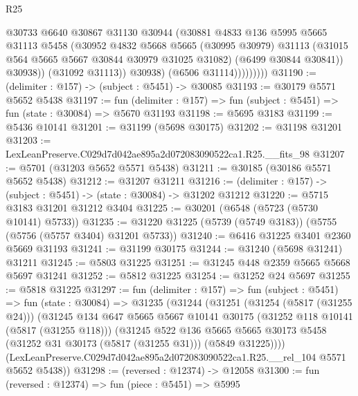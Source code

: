 \begin{lexlean}{R25}
\begin{coremodule}
                          @30733
                          @6640
                          @30867
                          @31130
                          @30944
                          (@30881
                            @4833
                            @136
                            @5995
                            @5665
                            @31113
                            @5458
                            (@30952
                              @4832
                              @5668
                              @5665
                              (@30995 @30979)
                              @31113
                              (@31015 @564 @5665 @5667 @30844 @30979 @31025 @31082)
                              (@6499 @30844 @30841))
                            @30938))
                        (@31092 @31113))
                      @30938)
                    (@6506 @31114)))))))))
@31190 := (delimiter : @157) -> (subject : @5451) -> @30085
@31193 := @30179 @5571 @5652 @5438
@31197 := fun (delimiter : @157) => fun (subject : @5451) => fun (state : @30084) => @5670 @31193
@31198 := @5695 @3183
@31199 := @5436 @10141
@31201 := @31199 (@5698 @30175)
@31202 := @31198 @31201
@31203 := LexLeanPreserve.C029d7d042ae895a2d072083090522ca1.R25.__fits_98
@31207 := @5701 (@31203 @5652 @5571 @5438)
@31211 := @30185 (@30186 @5571 @5652 @5438)
@31212 := @31207 @31211
@31216 := (delimiter : @157) -> (subject : @5451) -> (state : @30084) -> @31202 @31212
@31220 := @5715 @3183 @31201 @31212 @3404
@31225 := @30201 (@6548 (@5723 (@5730 @10141) @5733))
@31235 := @31220 @31225 (@5739 (@5749 @3183)) (@5755 (@5756 (@5757 @3404) @31201 @5733))
@31240 := @6416 @31225 @3401 @2360 @5669 @31193
@31241 := @31199 @30175
@31244 := @31240 (@5698 @31241) @31211
@31245 := @5803 @31225
@31251 := @31245 @448 @2359 @5665 @5668 @5697 @31241
@31252 := @5812 @31225
@31254 := @31252 @24 @5697
@31255 := @5818 @31225
@31297 := fun (delimiter : @157) =>
  fun (subject : @5451) =>
  fun (state : @30084) =>
  @31235
    (@31244
      (@31251
        (@31254 (@5817 (@31255 @24)))
        (@31245
          @134
          @647
          @5665
          @5667
          @10141
          @30175
          (@31252 @118 @10141 (@5817 (@31255 @118)))
          (@31245
            @522
            @136
            @5665
            @5665
            @30173
            @5458
            (@31252 @31 @30173 (@5817 (@31255 @31)))
            (@5849 @31225))))
      (LexLeanPreserve.C029d7d042ae895a2d072083090522ca1.R25.__rel_104 @5571 @5652 @5438))
@31298 := (reversed : @12374) -> @12058
@31300 := fun (reversed : @12374) => fun (piece : @5451) => @5995

\end{coremodule}
\end{lexlean}
